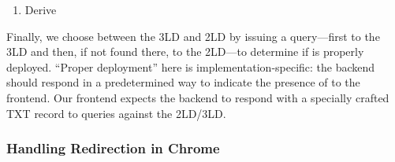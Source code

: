 \begin{enumerate}
    \item Derive 
\end{enumerate}

Finally, we choose between the 3LD and 2LD by issuing a query---first to the 3LD
and then, if not found there, to the 2LD---to determine if \SYSTEM{} is properly
deployed. ``Proper deployment'' here is implementation-specific: the backend
should respond in a predetermined way to indicate the presence of \SYSTEM{} to
the frontend. Our frontend expects the backend to respond with a specially
crafted TXT record to queries against the 2LD/3LD.

\subsubsection{Handling Redirection in Chrome}
